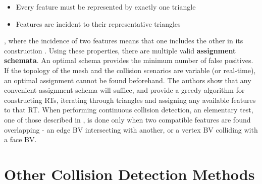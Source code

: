 \begin{itemize}
	\item Every feature must be represented by exactly one triangle
	\item Features are incident to their representative triangles
\end{itemize}

, where the incidence of two features means that one includes the other in its construction \citep{curtis2008}. Using these properties, there are multiple valid \textbf{assignment schemata}. An optimal schema provides the minimum number of false positives. If the topology of the mesh and the collision scenarios are variable (or real-time), an optimal assignment cannot be found beforehand. The authors show that any convenient assignment schema will suffice, and provide a greedy algorithm for constructing RTs, iterating through triangles and assigning any available features to that RT. When performing continuous collision detection, an elementary test, one of those described in \citep{provot97}, is done only when two compatible features are found overlapping - an edge BV intersecting with another, or a vertex BV colliding with a face BV.


\section{Other Collision Detection Methods}
\label{sec:others}


